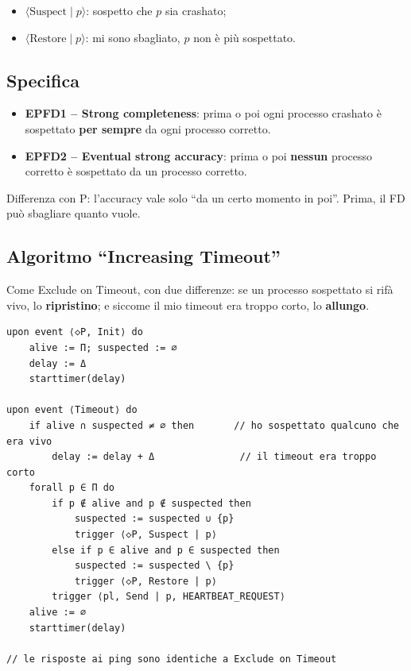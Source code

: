 \begin{itemize}
\tightlist
\item
  \(\langle \text{Suspect} \mid p \rangle\): sospetto che \(p\) sia crashato;
\item
  \(\langle \text{Restore} \mid p \rangle\): mi sono sbagliato, \(p\) non è più sospettato.
\end{itemize}

\subsection{Specifica}

\begin{itemize}
\tightlist
\item
  \textbf{EPFD1 -- Strong completeness}: prima o poi ogni processo crashato è sospettato \textbf{per sempre} da ogni processo corretto.
\item
  \textbf{EPFD2 -- Eventual strong accuracy}: prima o poi \textbf{nessun} processo corretto è sospettato da un processo corretto.
\end{itemize}

Differenza con P: l'accuracy vale solo ``da un certo momento in poi''. Prima, il FD può sbagliare quanto vuole.

\subsection{Algoritmo ``Increasing Timeout''}

Come Exclude on Timeout, con due differenze: se un processo sospettato si rifà vivo, lo \textbf{ripristino}; e siccome il mio timeout era troppo corto, lo \textbf{allungo}.

\begin{verbatim}
upon event ⟨◇P, Init⟩ do
    alive := Π; suspected := ∅
    delay := Δ
    starttimer(delay)

upon event ⟨Timeout⟩ do
    if alive ∩ suspected ≠ ∅ then       // ho sospettato qualcuno che era vivo
        delay := delay + Δ               // il timeout era troppo corto
    forall p ∈ Π do
        if p ∉ alive and p ∉ suspected then
            suspected := suspected ∪ {p}
            trigger ⟨◇P, Suspect | p⟩
        else if p ∈ alive and p ∈ suspected then
            suspected := suspected \ {p}
            trigger ⟨◇P, Restore | p⟩
        trigger ⟨pl, Send | p, HEARTBEAT_REQUEST⟩
    alive := ∅
    starttimer(delay)

// le risposte ai ping sono identiche a Exclude on Timeout
\end{verbatim}

